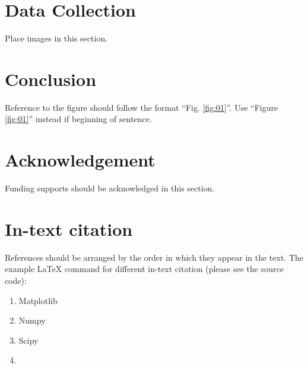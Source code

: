 \documentclass[11pt, a4paper, twocolumn]{article}
\begin{document}
\section{Data Collection}
\label{datacollection}
Place images in this section.



\section{Conclusion}
\label{conclusion}



Reference to the figure should follow the format “Fig. \ref{fig:01}”. Use “Figure \ref{fig:01}” instead if beginning of sentence. 


\section*{Acknowledgement}
\label{acknowledgement}
Funding supports should be acknowledged in this section.\\

\par

\section{In-text citation}
References should be arranged by the order in which they appear in the text. The example \LaTeX{} command for different in-text citation (please see the source code):
\begin{enumerate}
    \item Matplotlib
    \item Numpy
    \item Scipy
    \item  \cite{kusoncum2021heuristics}

\end{enumerate}

% 
% 
\printbibliography
\end{document}
